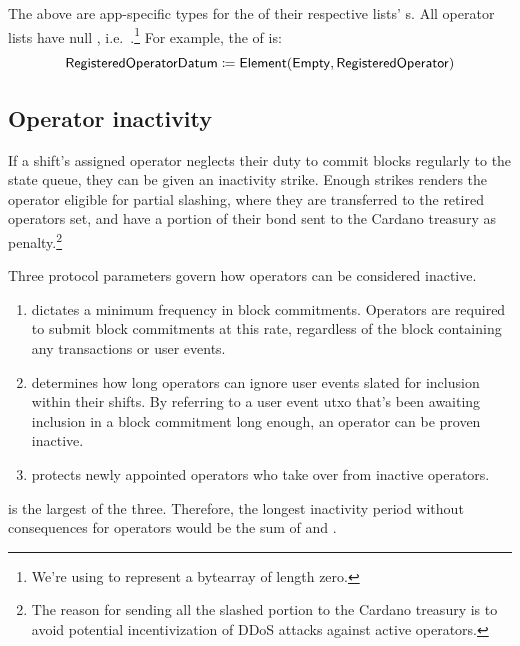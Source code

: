 \documentclass[../midgard.tex]{subfiles}
\begin{document}
The above are app-specific types for the  of their respective lists' s.
All operator lists have null , i.e.\ .\footnote{We're using  to represent a bytearray of length zero.}
For example, the  of  is:
\begin{equation*}
  \mathsf{RegisteredOperatorDatum} \coloneq \mathsf{Element} (\mathsf{Empty}, \mathsf{RegisteredOperator})
\end{equation*}

\subsection{Operator inactivity}
\label{h:operator-inactivity}

If a shift's assigned operator neglects their duty to commit blocks regularly to the state queue, they can be given an inactivity strike.
Enough strikes renders the operator eligible for partial slashing, where they are transferred to the retired operators set, and have a portion of their bond sent to the Cardano treasury as penalty.\footnote{The reason for sending all the slashed portion to the Cardano treasury is to avoid potential incentivization of DDoS attacks against active operators.}

Three protocol parameters govern how operators can be considered inactive.
\begin{enumerate}
  \item {} dictates a minimum frequency in block commitments.
    Operators are required to submit block commitments at this rate, regardless of the block containing any transactions or user events.
  \item {} determines how long operators can ignore user events slated for inclusion within their shifts.
    By referring to a user event utxo that's been awaiting inclusion in a block commitment long enough, an operator can be proven inactive.
  \item {} protects newly appointed operators who take over from inactive operators.
\end{enumerate}

 is the largest of the three.
Therefore, the longest inactivity period without consequences for operators would be the sum of  and .
\end{document}
